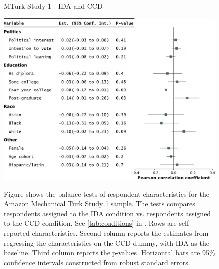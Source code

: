 \begin{center}
	\begin{figure}
		\centering
		\caption{MTurk Study 1---IDA and CCD}
		\includegraphics[width=\textwidth]{../figs/study1-baltest-14k-ips.pdf}
		\label{fig:baltest-24k-rw}
		\caption*{\footnotesize 
			Figure shows the balance tests of respondent characteristics for the Amazon Mechanical Turk Study 1 sample.
			The tests compares respondents assigned to the IDA condition vs. respondents assigned to the CCD condition.
			See \cref{tab:conditions} in .
			Rows are self-reported characteristics.
			Second column reports the estimates from regressing the characteristics on the CCD dummy, with IDA as the baseline.
			Third column reports the p-values.
			Horizontal bars are 95\% confidence intervals constructed from robust standard errors.
		}
	\end{figure}
\end{center}


